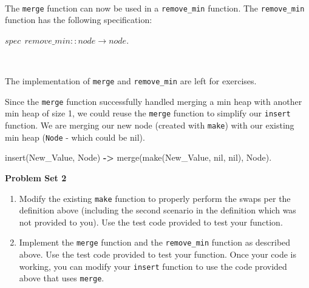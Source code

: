 \documentclass[
]{book}
\newenvironment{Shaded}{\begin{snugshade}}{\end{snugshade}}
\newcommand{\CharTok}[1]{\textcolor[rgb]{0.31,0.60,0.02}{#1}}
\newcommand{\FunctionTok}[1]{\textcolor[rgb]{0.00,0.00,0.00}{#1}}
\newcommand{\OperatorTok}[1]{\textcolor[rgb]{0.81,0.36,0.00}{\textbf{#1}}}
\newcommand{\VariableTok}[1]{\textcolor[rgb]{0.00,0.00,0.00}{#1}}
\providecommand{\tightlist}{%
  \setlength{\itemsep}{0pt}\setlength{\parskip}{0pt}}
\begin{document}
\(\nonumber\)

The \texttt{merge} function can now be used in a \texttt{remove\_min} function. The \texttt{remove\_min} function has the following specification:

\begin{formulabox}
\(spec ~ ~ remove\_min :: node \rightarrow node.\)

\end{formulabox}

\(\nonumber\)

The implementation of \texttt{merge} and \texttt{remove\_min} are left for exercises.

Since the \texttt{merge} function successfully handled merging a min heap with another min heap of size 1, we could reuse the \texttt{merge} function to simplify our \texttt{insert} function. We are merging our new node (created with \texttt{make}) with our existing min heap (\texttt{Node} - which could be nil).

\begin{Shaded}
\begin{Highlighting}[]
\FunctionTok{insert(}\VariableTok{New\_Value}\FunctionTok{,} \VariableTok{Node}\FunctionTok{)} \OperatorTok{{-}\textgreater{}} \FunctionTok{merge(make(}\VariableTok{New\_Value}\FunctionTok{,} \CharTok{nil}\FunctionTok{,} \CharTok{nil}\FunctionTok{),} \VariableTok{Node}\FunctionTok{).}
\end{Highlighting}
\end{Shaded}

\begin{problembox}

\textbf{Problem Set 2}

\begin{enumerate}
\def\labelenumi{\arabic{enumi}.}
\tightlist
\item
  Modify the existing \texttt{make} function to properly perform the swaps per the definition above (including the second scenario in the definition which was not provided to you). Use the test code provided to test your function.\\
\item
  Implement the \texttt{merge} function and the \texttt{remove\_min} function as described above. Use the test code provided to test your function. Once your code is working, you can modify your \texttt{insert} function to use the code provided above that uses \texttt{merge}.
\end{enumerate}

\end{problembox}
\end{document}
